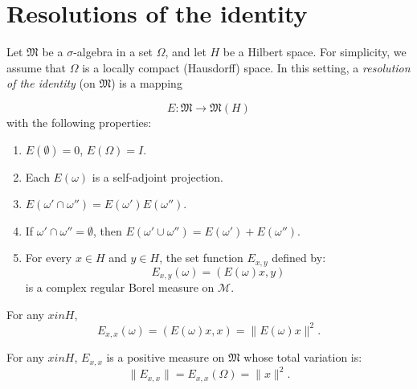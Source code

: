 \section{Resolutions of the identity}

\begin{definition}[12.17]
  Let $\mathfrak{M}$ be a $\sigma$-algebra in a set $\Omega$, and let $H$ be a Hilbert space.
  For simplicity, we assume that $\Omega$ is a locally compact (Hausdorff) space.
  In this setting, a \emph{resolution of the identity} (on $\mathfrak{M}$) is a mapping

  \[
    E: \mathfrak{M} \to \mathfrak{M}(H)
  \]
  with the following properties:

  \begin{enumerate}
    \item \label{itm:Ra} \( E(\emptyset) = 0\), \(E(\Omega) = I\).
    \item \label{itm:Rb}  Each \( E(\omega) \) is a self-adjoint projection.
    \item \label{itm:Rc} \( E(\omega' \cap \omega'') = E(\omega')E(\omega'')\).
    \item \label{itm:Rd}  If \( \omega' \cap \omega'' = \emptyset \), then \( E(\omega' \cup \omega'') = E(\omega') + E(\omega'') \).
    \item \label{itm:Re}  For every \( x \in H \) and \( y \in H \), the set function \( E_{x,y} \) defined by:
          \[
            E_{x,y}(\omega) = (E(\omega)x, y)
          \]
          is a complex regular Borel measure on \( \mathcal{M} \).
  \end{enumerate}
\end{definition}


\begin{lemma}
 For any $x in H$,
 \[
  E_{x,x}(\omega) = (E(\omega)x, x) = \|E(\omega)x\|^2.
 \]
\end{lemma}

\begin{lemma}
 For any $x in H$,
 \( E_{x,x} \) is a positive measure on \( \mathfrak{M} \) whose total variation is:
 \[
  \|E_{x,x}\| = E_{x,x}(\Omega) = \|x\|^2.
 \]
\end{lemma}

